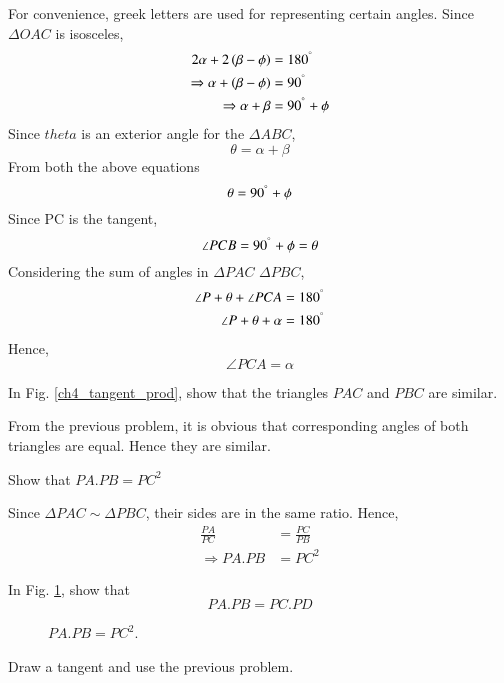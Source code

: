 %
\proof For convenience, greek letters are used for representing certain angles. Since $\Delta OAC$ is isosceles,
%
\begin{align}
2 \alpha + 2 \left(\beta - \phi\right) &= 180^{\degree} \\
\Rightarrow  \alpha +  \left(\beta - \phi\right) &= 90^{\degree} \\
\Rightarrow  \alpha +  \beta  &= 90^{\degree} + \phi
\end{align}
%
Since $theta$ is an exterior angle for the $\Delta ABC
$,
%
\begin{equation}
\theta = \alpha + \beta
\end{equation}
%
From both the above equations
%
\begin{equation}
\theta = 90^{\degree} + \phi
\end{equation}
%
Since PC is the tangent, 
%
\begin{equation}
\angle PCB = 90^{\degree} + \phi = \theta
\end{equation}
%
Considering the sum of angles in $\Delta PAC$ $\Delta PBC$,
%
\begin{align}
\angle P + \theta + \angle PCA &= 180^{\degree} \\
\angle P + \theta + \alpha &= 180^{\degree}
\end{align}
Hence,
%
\begin{equation}
\angle PCA = \alpha
\end{equation}
%
\begin{problem}
	In Fig. \ref{ch4_tangent_prod}, show that the triangles $PAC$ and $PBC$ are similar.
\end{problem}
\proof From the previous problem, it is obvious that corresponding angles of both triangles are equal.  Hence they are similar.
%
\begin{problem}
	Show that $PA.PB = PC^2$
\end{problem}
\proof Since $\Delta PAC \sim \Delta PBC$, their sides are in the same ratio.  Hence,
%
\begin{align}
\frac{PA}{PC} &= \frac{PC}{PB} \\
\Rightarrow PA.PB &=PC^2
\end{align}
%
%
\begin{problem}
	In Fig. \ref{ch4_chord_tangent_prod}, show that\begin{equation}
	PA.PB = PC.PD
	\end{equation}
\end{problem}
%
\begin{figure}[!h]
	\begin{center}
		
		\resizebox{\columnwidth}{!}{}
	\end{center}
	\caption{$PA.PB = PC^2$.}
	\label{ch4_chord_tangent_prod}	
\end{figure}

\proof Draw a tangent and use the previous problem.
